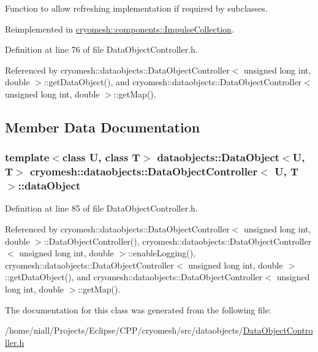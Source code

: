 \-Function to allow refreshing implementation if required by subclasses. 



\-Reimplemented in \hyperlink{classcryomesh_1_1components_1_1ImpulseCollection_a892cc1028a9539de15668c39511adba3}{cryomesh\-::components\-::\-Impulse\-Collection}.



\-Definition at line 76 of file \-Data\-Object\-Controller.\-h.



\-Referenced by cryomesh\-::dataobjects\-::\-Data\-Object\-Controller$<$ unsigned long int, double $>$\-::get\-Data\-Object(), and cryomesh\-::dataobjects\-::\-Data\-Object\-Controller$<$ unsigned long int, double $>$\-::get\-Map().



\subsection{\-Member \-Data \-Documentation}
\hypertarget{classcryomesh_1_1dataobjects_1_1DataObjectController_aa13d30e9fa2f1caa0510635214d4bb26}{
\subsubsection[{data\-Object}]{\setlength{\rightskip}{0pt plus 5cm}template$<$class \-U, class \-T$>$ {\bf dataobjects\-::\-Data\-Object}$<$\-U, \-T$>$ {\bf cryomesh\-::dataobjects\-::\-Data\-Object\-Controller}$<$ \-U, \-T $>$\-::{\bf data\-Object}}}\label{classcryomesh_1_1dataobjects_1_1DataObjectController_aa13d30e9fa2f1caa0510635214d4bb26}


\-Definition at line 85 of file \-Data\-Object\-Controller.\-h.



\-Referenced by cryomesh\-::dataobjects\-::\-Data\-Object\-Controller$<$ unsigned long int, double $>$\-::\-Data\-Object\-Controller(), cryomesh\-::dataobjects\-::\-Data\-Object\-Controller$<$ unsigned long int, double $>$\-::enable\-Logging(), cryomesh\-::dataobjects\-::\-Data\-Object\-Controller$<$ unsigned long int, double $>$\-::get\-Data\-Object(), and cryomesh\-::dataobjects\-::\-Data\-Object\-Controller$<$ unsigned long int, double $>$\-::get\-Map().



\-The documentation for this class was generated from the following file\-:\begin{DoxyCompactItemize}
\item 
/home/niall/\-Projects/\-Eclipse/\-C\-P\-P/cryomesh/src/dataobjects/\hyperlink{DataObjectController_8h}{\-Data\-Object\-Controller.\-h}\end{DoxyCompactItemize}

